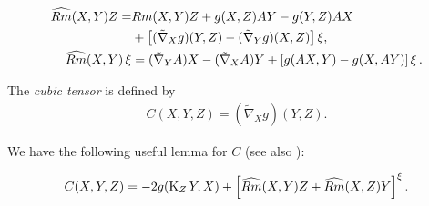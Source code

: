 \documentclass{amsart}
\begin{document}
\begin{align}
\label{eq:structure1}
\widehat{Rm} (X, Y) Z =& Rm(X, Y) Z + g(X, Z) A Y - g(Y, Z)A X \\
&+ \left[(\tilde{\nabla}_X g) (Y, Z) - (\tilde{\nabla}_Y g)( X, Z)\right] \operatorname{\xi} \nonumber,\\
\label{eq:structure2}
\widehat{Rm} (X, Y) \operatorname{\xi} &= (\tilde{\nabla}_Y A) X - (\tilde{\nabla}_X A) Y + \left[g(AX, Y) - g(X, AY)\right]\operatorname{\xi}.
\end{align}

The \emph{cubic tensor} is defined by
\begin{align}
C(X,Y,Z) = (\tilde{\nabla}_X g) (Y,Z).
\end{align}

We have the following useful lemma for $C$ (see also \cite[Section II, Proposition 4.1]{MR1311248}):

\begin{lemma}
\label{lem:cubic_symmetry}
\[
C(X, Y, Z) =  -2g(\operatorname{K}_Z Y, X) + \left[\widehat{Rm}(X, Y)Z + \widehat{Rm}(X, Z)Y\right]^{\operatorname{\xi}}.
\]
\end{lemma}
\end{document}
